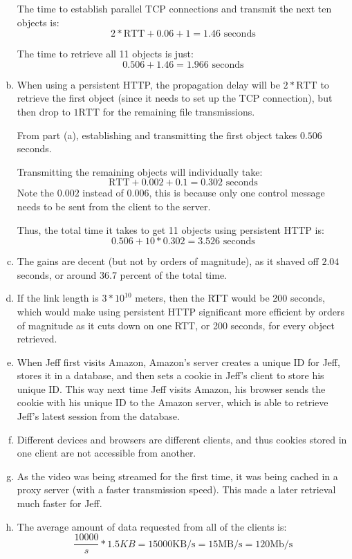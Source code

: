 \documentclass[11pt]{article}
\begin{document}
\begin{enumerate}[(a)]
      The time to establish parallel TCP connections and transmit the next ten objects
      is:
      \[ 2 * \text{RTT} + 0.06 + 1 = 1.46 \text{ seconds} \]

      The time to retrieve all 11 objects is just:
      \[ 0.506 + 1.46 = \boxed{1.966 \text{ seconds}} \]
    \item
      When using a persistent HTTP, the propagation delay will be $2 * \text{RTT}$
      to retrieve the first object (since it needs to set up the TCP connection),
      but then drop to $1 \text{RTT}$ for the remaining file transmissions.

      From part (a), establishing and transmitting the first object takes
      $0.506$ seconds.

      Transmitting the remaining objects will individually take:
      \[ \text{RTT} + 0.002 + 0.1 = 0.302 \text{ seconds} \]
      Note the $0.002$ instead of $0.006$, this is because only one control message
      needs to be sent from the client to the server.

      Thus, the total time it takes to get 11 objects using persistent HTTP is:
      \[ 0.506 + 10 * 0.302 = \boxed{3.526 \text{ seconds}} \]
    \item
      The gains are decent (but not by orders of magnitude), as it shaved off $2.04$
      seconds, or around 36.7 percent of the total time.
    \item
      If the link length is $3 * 10^{10}$ meters, then the RTT would be 200 seconds,
      which would make using persistent HTTP significant more efficient by orders of
      magnitude as it cuts down on one RTT, or 200 seconds, for every object retrieved.
    \item
      When Jeff first visits Amazon, Amazon's server creates a unique ID for Jeff,
      stores it in a database, and then sets a cookie in Jeff's client to store
      his unique ID. This way next time Jeff visits Amazon, his browser sends the
      cookie with his unique ID to the Amazon server, which is able to retrieve
      Jeff's latest session from the database.
    \item
      Different devices and browsers are different clients, and thus cookies stored in one
      client are not accessible from another.
    \item
      As the video was being streamed for the first time, it was being cached in a
      proxy server (with a faster transmission speed). This made a later retrieval
      much faster for Jeff.
    \item
      The average amount of data requested from all of the clients is:
      \[ \frac{10000}{s} * 1.5KB = 15000 \text{KB/s} = 15 \text{MB/s} = 120 \text{Mb/s} \]


\end{enumerate}
\end{document}
